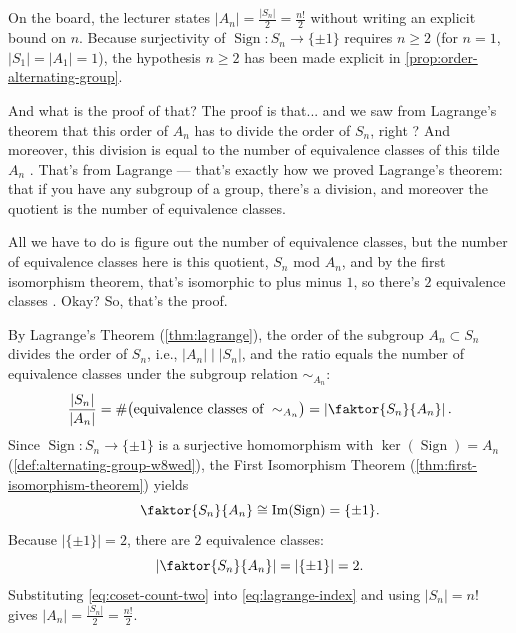 \begin{aiNote}
On the board, the lecturer states $|A_n| = \frac{|S_n|}{2} = \frac{n!}{2}$ without writing an explicit bound on $n$. Because surjectivity of $\operatorname{Sign} \colon S_n \to \{\pm 1\}$ requires $n \ge 2$ (for $n = 1$, $|S_1| = |A_1| = 1$), the hypothesis $n \ge 2$ has been made explicit in \cref{prop:order-alternating-group}.
\end{aiNote}

\begin{proofWrapper}

\begin{speech}[00:13:09 - 00:14:25]
And what is the proof of that? The proof is that... and we saw from Lagrange's theorem that this order of $A_n$ has to divide the order of $S_n$, right ? And moreover, this division is equal to the number of equivalence classes of this tilde $A_n$ . That's from Lagrange --- that's exactly how we proved Lagrange's theorem: that if you have any subgroup of a group, there's a division, and moreover the quotient is the number of equivalence classes.

All we have to do is figure out the number of equivalence classes, but the number of equivalence classes here is this quotient, $S_n$ mod $A_n$, and by the first isomorphism theorem, that's isomorphic to plus minus $1$, so there's $2$ equivalence classes . Okay? So, that's the proof.
\end{speech}

\begin{content}
By Lagrange's Theorem (\cref{thm:lagrange}), the order of the subgroup $A_n \subset S_n$ divides the order of $S_n$, i.e., $|A_n| \mid |S_n|$, and the ratio equals the number of equivalence classes under the subgroup relation $\sim_{A_n}$:
\begin{equation}\label{eq:lagrange-index}
\frac{|S_n|}{|A_n|} = \#\bigl(\text{equivalence classes of } \sim_{A_n}\bigr) = \left| \faktor{S_n}{A_n} \right|.
\end{equation}
Since $\operatorname{Sign} \colon S_n \to \{\pm 1\}$ is a surjective homomorphism with $\ker(\operatorname{Sign}) = A_n$ (\cref{def:alternating-group-w8wed}), the First Isomorphism Theorem (\cref{thm:first-isomorphism-theorem}) yields
\begin{equation}\label{eq:sn-an-isomorphism}
\faktor{S_n}{A_n} \cong \operatorname{Im}(\operatorname{Sign}) = \{\pm 1\}.
\end{equation}
Because $|\{\pm 1\}| = 2$, there are $2$ equivalence classes:
\begin{equation}\label{eq:coset-count-two}
\left| \faktor{S_n}{A_n} \right| = |\{\pm 1\}| = 2.
\end{equation}
Substituting \eqref{eq:coset-count-two} into \eqref{eq:lagrange-index} and using $|S_n| = n!$ gives $|A_n| = \frac{|S_n|}{2} = \frac{n!}{2}$.


\end{content}
\end{proofWrapper}
